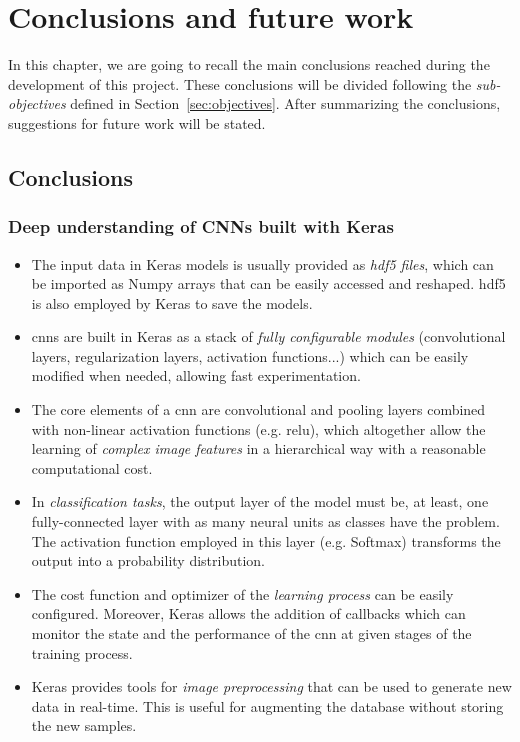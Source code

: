 \chapter{Conclusions and future work}\label{ch:conclusions}
In this chapter, we are going to recall the main conclusions reached during the development of this project. These conclusions will be divided following the \emph{sub-objectives} defined in Section~\ref{sec:objectives}. After summarizing the conclusions, suggestions for future work will be stated.

\section{Conclusions}
\subsection*{Deep understanding of CNNs built with Keras}
\begin{itemize}
	\item The input data in Keras models is usually provided as \emph{\gls{hdf5} files}, which can be imported as Numpy arrays that can be easily accessed and reshaped. \gls{hdf5} is also employed by Keras to save the models.
	\item \glspl{cnn} are built in Keras as a stack of \emph{fully configurable modules} (convolutional layers, regularization layers, activation functions...) which can be easily modified when needed, allowing fast experimentation.
	\item The core elements of a \gls{cnn} are convolutional and pooling layers combined with non-linear activation functions (e.g. \gls{relu}), which altogether allow the learning of \emph{complex image features} in a hierarchical way with a reasonable computational cost.
	\item In \emph{classification tasks}, the output layer of the model must be, at least, one fully-connected layer with as many neural units as classes have the problem. The activation function employed in this layer (e.g. Softmax) transforms the output into a probability distribution.
	\item The cost function and optimizer of the \emph{learning process} can be easily configured. Moreover, Keras allows the addition of callbacks which can monitor the state and the performance of the \gls{cnn} at given stages of the training process.
	\item Keras provides tools for \emph{image preprocessing} that can be used to generate new data in real-time. This is useful for augmenting the database without storing the new samples.
\end{itemize}

